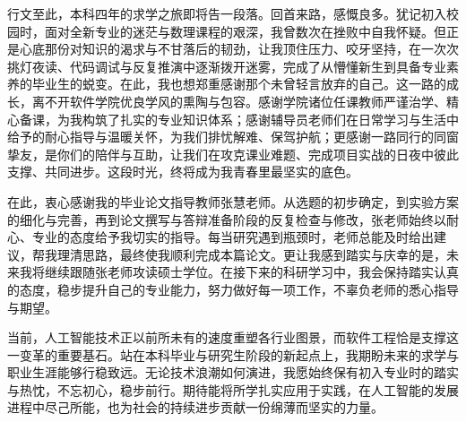 
\begin{acknowledgements}
  行文至此，本科四年的求学之旅即将告一段落。回首来路，感慨良多。犹记初入校园时，面对全新专业的迷茫与数理课程的艰深，我曾数次在挫败中自我怀疑。但正是心底那份对知识的渴求与不甘落后的韧劲，让我顶住压力、咬牙坚持，在一次次挑灯夜读、代码调试与反复推演中逐渐拨开迷雾，完成了从懵懂新生到具备专业素养的毕业生的蜕变。在此，我也想郑重感谢那个未曾轻言放弃的自己。这一路的成长，离不开软件学院优良学风的熏陶与包容。感谢学院诸位任课教师严谨治学、精心备课，为我构筑了扎实的专业知识体系；感谢辅导员老师们在日常学习与生活中给予的耐心指导与温暖关怀，为我们排忧解难、保驾护航；更感谢一路同行的同窗挚友，是你们的陪伴与互助，让我们在攻克课业难题、完成项目实战的日夜中彼此支撑、共同进步。这段时光，终将成为我青春里最坚实的底色。
  
  在此，衷心感谢我的毕业论文指导教师张慧老师。从选题的初步确定，到实验方案的细化与完善，再到论文撰写与答辩准备阶段的反复检查与修改，张老师始终以耐心、专业的态度给予我切实的指导。每当研究遇到瓶颈时，老师总能及时给出建议，帮我理清思路，最终使我顺利完成本篇论文。更让我感到踏实与庆幸的是，未来我将继续跟随张老师攻读硕士学位。在接下来的科研学习中，我会保持踏实认真的态度，稳步提升自己的专业能力，努力做好每一项工作，不辜负老师的悉心指导与期望。
  
  当前，人工智能技术正以前所未有的速度重塑各行业图景，而软件工程恰是支撑这一变革的重要基石。站在本科毕业与研究生阶段的新起点上，我期盼未来的求学与职业生涯能够行稳致远。无论技术浪潮如何演进，我愿始终保有初入专业时的踏实与热忱，不忘初心，稳步前行。期待能将所学扎实应用于实践，在人工智能的发展进程中尽己所能，也为社会的持续进步贡献一份绵薄而坚实的力量。
\end{acknowledgements}
